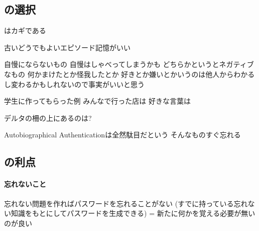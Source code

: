 \documentclass[twoside]{wiss}
\begin{document}
% 

\subsection{{\SQ}の選択}
\label{goodquestions}

{\SQ}はカギである

古いどうでもよいエピソード記憶がいい

自慢にならないもの
  自慢はしゃべってしまうかも
どちらかというとネガティブなもの
  何かまけたとか怪我したとか
好きとか嫌いとかいうのは他人からわかるし変わるかもしれないので事実がいいと思う

学生に作ってもらった例
  みんなで行った店は
  好きな言葉は

デルタの柵の上にあるのは?

Autobiographical Authenticationは全然駄目だという\cite{林}
そんなものすぐ忘れる


\subsection{{\EP}の利点}

\paragraph{忘れないこと}

忘れない問題を作ればパスワードを忘れることがない
(すでに持っている忘れない知識をもとにしてパスワードを生成できる)
 = 新たに何かを覚える必要が無いのが良い
\end{document}
